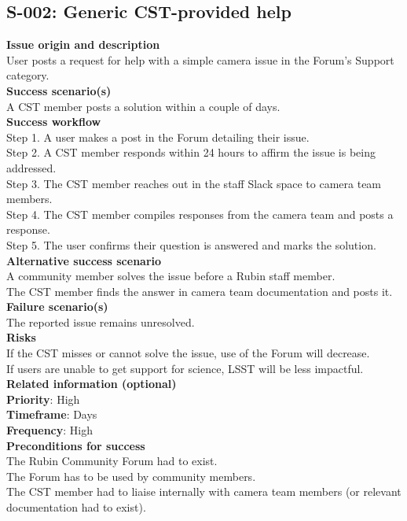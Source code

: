 \subsection{S-002: Generic CST-provided help}

\textbf {Issue origin and description} \\
User posts a request for help with a simple camera issue in the Forum's Support category. \\

\textbf {Success scenario(s)} \\
A CST member posts a solution within a couple of days. \\

\textbf {Success workflow} \\
Step 1. A user makes a post in the Forum detailing their issue. \\
Step 2. A CST member responds within 24 hours to affirm the issue is being addressed. \\
Step 3. The CST member reaches out in the staff Slack space to camera team members. \\
Step 4. The CST member compiles responses from the camera team and posts a response. \\
Step 5. The user confirms their question is answered and marks the solution. \\

\textbf {Alternative success scenario} \\
A community member solves the issue before a Rubin staff member. \\
The CST member finds the answer in camera team documentation and posts it. \\

\textbf {Failure scenario(s)} \\
The reported issue remains unresolved. \\

\textbf {Risks}\\
If the CST misses or cannot solve the issue, use of the Forum will decrease. \\
If users are unable to get support for science, LSST will be less impactful. \\

\textbf {Related information (optional)} \\
\textbf{Priority}: High \\
\textbf{Timeframe}: Days \\
\textbf{Frequency}: High \\

\textbf {Preconditions for success}\\
The Rubin Community Forum had to exist. \\
The Forum has to be used by community members. \\
The CST member had to liaise internally with camera team members (or relevant documentation had to exist). \\
